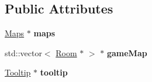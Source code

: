\subsection*{Public Attributes}
\begin{DoxyCompactItemize}
\item 
\hypertarget{class_game_adef62d41374c1440a78855c7f9994697}{\hyperlink{class_maps}{Maps} $\ast$ {\bfseries maps}}\label{class_game_adef62d41374c1440a78855c7f9994697}

\item 
\hypertarget{class_game_a1f7fc712fe4fa4c2be6b3afbeafe835b}{std\+::vector$<$ \hyperlink{class_room}{Room} $\ast$ $>$ $\ast$ {\bfseries game\+Map}}\label{class_game_a1f7fc712fe4fa4c2be6b3afbeafe835b}

\item 
\hypertarget{class_game_ad12d51a96df4a0d9633ca66cd6103b8a}{\hyperlink{class_tooltip}{Tooltip} $\ast$ {\bfseries tooltip}}\label{class_game_ad12d51a96df4a0d9633ca66cd6103b8a}

\end{DoxyCompactItemize}
